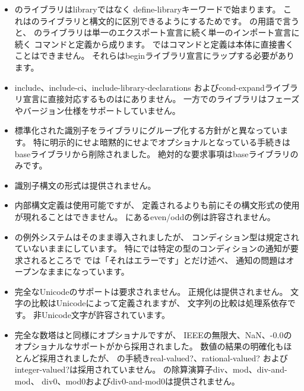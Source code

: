 \begin{itemize}
\item \rsevenrs{}のライブラリは{\cf library}ではなく
{\cf define-\+library}キーワードで始まります。
これは\rsixrs{}のライブラリと構文的に区別できるようにするためです。
\rsevenrs{}の用語で言うと、
\rsixrs{}のライブラリは単一のエクスポート宣言に続く単一のインポート宣言に続く
コマンドと定義から成ります。
\rsevenrs{}ではコマンドと定義は本体に直接書くことはできません。
それらは{\cf begin}ライブラリ宣言にラップする必要があります。

\item {\cf include}、{\cf include-\+ci}、{\cf include-\+library-\+declarations}
および{\cf cond-\+expand}ライブラリ宣言に直接対応するものは\rsixrs{}にありません。
一方で\rsevenrs{}のライブラリはフェーズやバージョン仕様をサポートしていません。

\item 標準化された識別子をライブラリにグループ化する方針が\rsixrs{}と異なっています。
特に明示的にせよ暗黙的にせよ\rfivers{}でオプショナルとなっている手続きは
baseライブラリから削除されました。
絶対的な要求事項はbaseライブラリのみです。

\item 識別子構文の形式は提供されません。

\item 内部構文定義は使用可能ですが、
定義されるよりも前にその構文形式の使用が現れることはできません。
\rsixrs{}にある{\cf even}/{\cf odd}の例は許容されません。

\item \rsixrs{}の例外システムはそのまま導入されましたが、
コンディション型は規定されていないままにしています。
特に\rsixrs{}では特定の型のコンディションの通知が要求されるところで
\rsevenrs{}では「それはエラーです」とだけ述べ、
通知の問題はオープンなままになっています。

\item 完全なUnicodeのサポートは要求されません。
正規化は提供されません。
文字の比較はUnicodeによって定義されますが、
文字列の比較は処理系依存です。
非Unicode文字が許容されています。

\item 完全な数塔は\rfivers{}と同様にオプショナルですが、
IEEEの無限大、NaN、{\mbox -0.0}のオプショナルなサポートが\rsixrs{}から採用されました。
数値の結果の明確化もほとんど採用されましたが、
\rsixrs{}の手続き{\cf real-valued?}、{\cf rational-valued?}
および{\cf integer-valued?}は採用されていません。
\rsixrs{}の除算演算子{\cf div}、{\cf mod}、{\cf div-and-mod}、
{\cf div0}、{\cf mod0}および{\cf div0-and-mod0}は提供されません。


\end{itemize}
